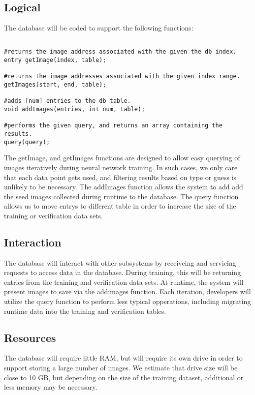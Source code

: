 \subsection{Logical}

The database will be coded to support the following functions:

\begin{verbatim}

#returns the image address associated with the given the db index.
entry getImage(index, table);

#returns the image addresses associated with the given index range.
getImages(start, end, table);

#adds [num] entries to the db table.
void addImages(entries, int num, table);

#performs the given query, and returns an array containing the results.
query(query);

\end{verbatim}

The getImage, and getImages functions are designed to allow easy querying of images iteratively during neural network training. In such cases, we only care that each data point gets used, and filtering results based on type or guess is unlikely to be necessary.
The addImages function allows the system to add add the seed images collected during runtime to the database.
The query function allows us to move entrys to different table in order to increase the size of the training or verification data sets. 

\subsection{Interaction}

The database will interact with other subsystems by receiveing and servicing requests to access data in the database. During training, this will be returning entries from the training and verification data sets. At runtime, the system will present images to save via the addimages function. Each iteration, developers will utilize the query function to perform less typical opperations, including migrating runtime data into the training and verification tables.

\subsection{Resources}

The database will require little RAM, but will require its own drive in order to support storing a large number of images. We estimate that drive size will be close to 10 GB, but depending on the size of the training dataset, additional or less memory may be necessary.


